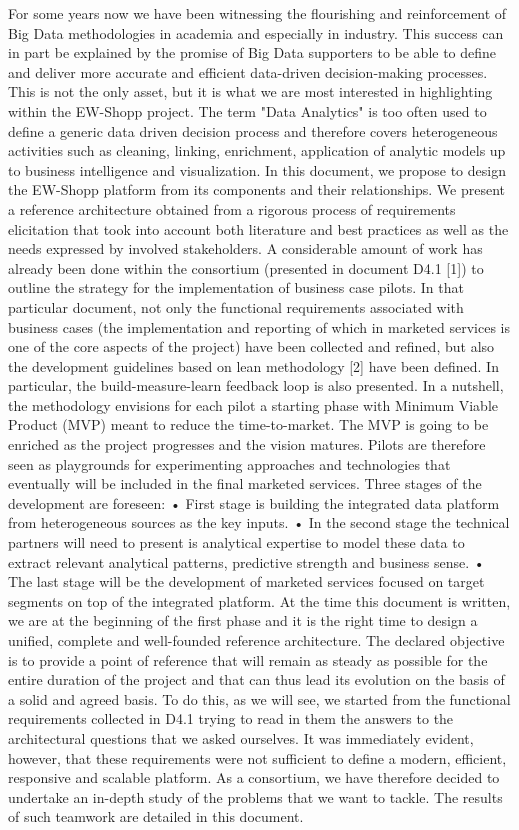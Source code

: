 For some years now we have been witnessing the flourishing and reinforcement of Big Data methodologies in academia and especially in industry. This success can in part be explained by the promise of Big Data supporters to be able to define and deliver more accurate and efficient data-driven decision-making processes. This is not the only asset, but it is what we are most interested in highlighting within the EW-Shopp project. 
The term "Data Analytics" is too often used to define a generic data driven decision process and therefore covers heterogeneous activities such as cleaning, linking, enrichment, application of analytic models up to business intelligence and visualization. In this document, we propose to design the EW-Shopp platform from its components and their relationships. We present a reference architecture obtained from a rigorous process of requirements elicitation that took into account both literature and best practices as well as the needs expressed by involved stakeholders. 
A considerable amount of work has already been done within the consortium (presented in document D4.1 [1]) to outline the strategy for the implementation of business case pilots. In that particular document, not only the functional requirements associated with business cases (the implementation and reporting of which in marketed services is one of the core aspects of the project) have been collected and refined, but also the development guidelines based on lean methodology [2] have been defined. In particular, the build-measure-learn feedback loop is also presented. In a nutshell, the methodology envisions for each pilot a starting phase with Minimum Viable Product (MVP) meant to reduce the time-to-market. The MVP is going to be enriched as the project progresses and the vision matures. Pilots are therefore seen as playgrounds for experimenting approaches and technologies that eventually will be included in the final marketed services. 
Three stages of the development are foreseen:
•	First stage is building the integrated data platform from heterogeneous sources as the key inputs. 
•	In the second stage the technical partners will need to present is analytical expertise to model these data to extract relevant analytical patterns, predictive strength and business sense.
•	The last stage will be the development of marketed services focused on target segments on top of the integrated platform.
At the time this document is written, we are at the beginning of the first phase and it is the right time to design a unified, complete and well-founded reference architecture. The declared objective is to provide a point of reference that will remain as steady as possible for the entire duration of the project and that can thus lead its evolution on the basis of a solid and agreed basis. To do this, as we will see, we started from the functional requirements collected in D4.1 trying to read in them the answers to the architectural questions that we asked ourselves.  It was immediately evident, however, that these requirements were not sufficient to define a modern, efficient, responsive and scalable platform. As a consortium, we have therefore decided to undertake an in-depth study of the problems that we want to tackle. The results of such teamwork are detailed in this document.  

